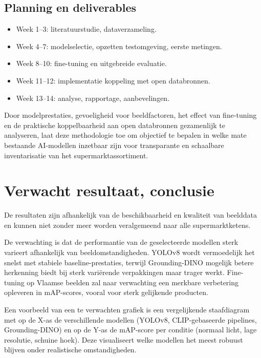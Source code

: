 \subsection*{Planning en deliverables}
\begin{itemize}
    \item Week 1–3: literatuurstudie, dataverzameling.
    \item Week 4–7: modelselectie, opzetten testomgeving, eerste metingen.
    \item Week 8–10: fine-tuning en uitgebreide evaluatie.
    \item Week 11–12: implementatie koppeling met open databronnen.
    \item Week 13–14: analyse, rapportage, aanbevelingen.
\end{itemize}

Door modelprestaties, gevoeligheid voor beeldfactoren, het effect van fine-tuning en de praktische koppelbaarheid aan open databronnen gezamenlijk te analyseren, laat deze methodologie toe om objectief te bepalen in welke mate bestaande AI-modellen inzetbaar zijn voor transparante en schaalbare inventarisatie van het supermarktassortiment.
\section{Verwacht resultaat, conclusie}%
\label{sec:verwachte_resultaten}

De resultaten zijn afhankelijk van de beschikbaarheid en kwaliteit van beelddata en kunnen niet zonder meer worden veralgemeend naar alle supermarktketens.

De verwachting is dat de performantie van de geselecteerde modellen sterk varieert afhankelijk van beeldomstandigheden. YOLOv8 wordt vermoedelijk het snelst met stabiele baseline-prestaties, terwijl Grounding-DINO mogelijk betere herkenning biedt bij sterk variërende verpakkingen maar trager werkt. Fine-tuning op Vlaamse beelden zal naar verwachting een merkbare verbetering opleveren in mAP-scores, vooral voor sterk gelijkende producten.

Een voorbeeld van een te verwachten grafiek is een vergelijkende staafdiagram met op de X-as de verschillende modellen (YOLOv8, CLIP-gebaseerde pipelines, Grounding-DINO) en op de Y-as de mAP-score per conditie (normaal licht, lage resolutie, schuine hoek). Deze visualiseert welke modellen het meest robuust blijven onder realistische omstandigheden.

